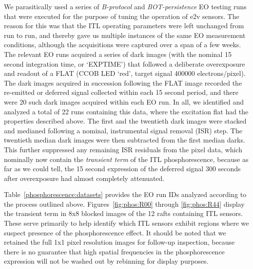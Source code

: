 We parasitically used a series of {\it B-protocol} and {\it BOT-persistence} EO testing runs that were executed for the purpose of tuning the operation of e2v sensors. The reason for this was that the ITL operating parameters were left unchanged from run to run, and thereby gave us multiple instances of the same EO measurement conditions, although the acquisitions were captured over a span of a few weeks. The relevant EO runs acquired a series of dark images (with the nominal 15 second integration time, or `EXPTIME') that followed a deliberate overexposure and readout of a FLAT (CCOB LED `red', target signal 400000 electrons/pixel). The dark images acquired in succession following the FLAT image recorded the re-emitted or deferred signal collected within each 15 second period, and there were 20 such dark images acquired within each EO run. In all, we identified and analyzed a total of 22 runs containing this data, where the excitation flat had the properties described above. The first and the twentieth dark images were stacked and medianed following a nominal, instrumental signal removal (ISR) step. The twentieth median dark images were then subtracted from the first median darks. This further suppressed any remaining ISR residuals from the pixel data, which nominally now contain the {\it transient term} of the ITL phosphorescence, because as far as we could tell, the 15 second expression of the deferred signal 300 seconds after overexposure had almost completely attenuated.

Table~\ref{phosphorescence:datasets} provides the EO run IDs analyzed according to the process outlined above. Figures~\ref{fig:phos:R00} through \ref{fig:phos:R44} display the transient term in 8x8 blocked images of the 12 rafts containing ITL sensors. These serve primarily to help identify which ITL sensors exhibit regions where we suspect presence of the phosphorescence effect. It should be noted that we retained the full 1x1 pixel resolution images for follow-up inspection, because there is no guarantee that high spatial frequencies in the phosphorescence expression will not be washed out by rebinning for display purposes.

